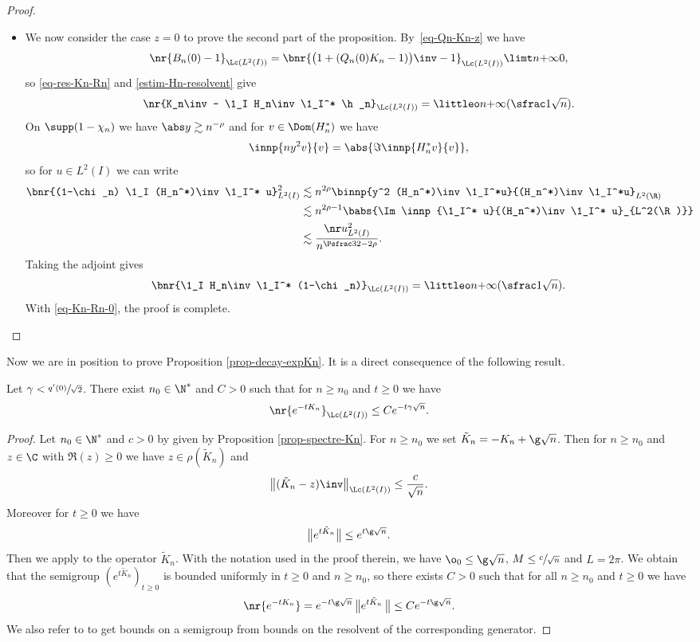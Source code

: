 \begin{proof}
\begin{itemize}
\item
We now consider the case $z = 0$ to prove the second part of the proposition. By~\eqref{eq-Qn-Kn-z} we have
\[
\nr{B_n(0) - 1}_{\Lc(L^2(I))} = \bnr{ \bigl(1 + (Q_n(0) K_n-1) \bigr)\inv - 1}_{\Lc(L^2(I))} \limt n {+\infty} 0,
\]
so \eqref{eq-res-Kn-Rn} and \eqref{estim-Hn-resolvent} give
\begin{equation} \label{eq-Kn-Rn-0}
\nr{K_n\inv - \1_I H_n\inv \1_I^* \h_n}_{\Lc(L^2(I))} = \littleo n {+\infty}(\sfrac 1 {\sqrt n}).
\end{equation}
On $\supp(1-\chi_n)$ we have $\abs y \gtrsim n^{-\rho}$ and for $v \in \Dom(H_n^*)$ we have
\[
\innp{n y^2 v}{v} = \abs{\Im\innp{H_n^* v}{v}},
\]
so for $u \in L^2(I)$ we can write
\begin{align*}
\bnr{(1-\chi_n) \1_I (H_n^*)\inv \1_I^* u}^2_{L^2(I)}
& \lesssim n^{2\rho} \binnp{y^2 (H_n^*)\inv \1_I^*u}{(H_n^*)\inv \1_I^*u}_{L^2(\R)} \\
& \lesssim n^{2\rho - 1} \babs{\Im \innp{\1_I^* u}{(H_n^*)\inv \1_I^* u}_{L^2(\R)}} \\
& \lesssim \frac {\nr u^2_{L^2(I)}}{n^{\Psfrac 32 - 2\rho}}.
\end{align*}
Taking the adjoint gives
\[
\bnr{\1_I H_n\inv \1_I^* (1-\chi_n)}_{\Lc(L^2(I))} = \littleo n {+\infty}(\sfrac 1 {\sqrt n}).
\]
With \eqref{eq-Kn-Rn-0}, the proof is complete.\qedhere
\end{itemize}
\end{proof}

Now we are in position to prove Proposition \ref{prop-decay-expKn}. It is a direct consequence of the following result.

\begin{proposition} \label{prop-exp-Kn}
Let $\gamma < \sfrac {q'(0)}{\sqrt 2}$. There exist $n_0 \in \N^*$ and $C > 0$ such that for $n \geq n_0$ and $t \geq 0$ we have
\[
\nr{e^{-tK_n}}_{\Lc(L^2(I))} \leq C e^{-t\gamma \sqrt n}.
\]
\end{proposition}

\begin{proof}
Let $n_0 \in \N^*$ and $c > 0$ by given by Proposition \ref{prop-spectre-Kn}. For $n \geq n_0$ we set $\tilde K_n = -K_n + \g \sqrt n$. Then for $n \geq n_0$ and $z \in \C$ with $\Re(z) \geq 0$ we have $z \in \rho(\tilde K_n)$ and
\[
\big\| (\tilde K_n - z)\inv \big\|_{\Lc(L^2(I))} \leq \frac {c}{\sqrt n}.
\]
Moreover for $t \geq 0$ we have
\[
\bigl\|e^{t \tilde K_n} \bigr\| \leq e^{t\g \sqrt n}.
\]
Then we apply \cite[Th. V.1.11 p. 302]{engel} to the operator $\tilde K_n$. With the notation used in the proof therein, we have $\o_0 \leq \g \sqrt n$, $M\leq \sfrac c {\sqrt n}$ and $L= 2\pi$. We obtain that the semigroup $(e^{t\tilde K_n})_{t \geq 0}$ is bounded uniformly in $t \geq 0$ and $n \geq n_0$, so there exists $C > 0$ such that for all $n \geq n_0$ and $t \geq 0$ we have
\[
\nr{e^{-tK_n}} = e^{-t\g \sqrt n}\, \bigl \| e^{t\tilde K_n}\, \bigr \| \leq C e^{-t\g \sqrt n}.
\]
We also refer to \cite{HelfferSjo10} to get bounds on a semigroup from bounds on the resolvent of the corresponding generator.
\end{proof}

